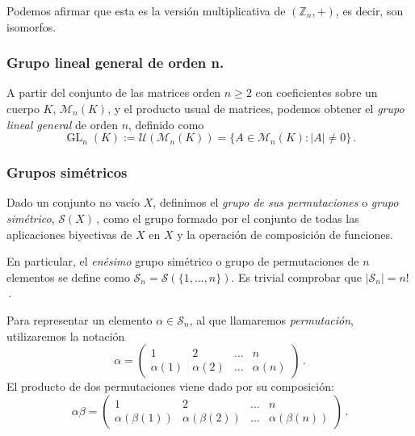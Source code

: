 Podemos afirmar que esta es la versión multiplicativa de $(\mathbb{Z}_n,+)$, es decir, son isomorfos.

\subsubsection{Grupo lineal general de orden n.}

A partir del conjunto de las matrices orden $n \geq 2$ con coeficientes sobre un cuerpo $K$, $\mathcal M_n(K)$, y el producto usual de matrices, podemos obtener el \textit{grupo lineal general} de orden $n$, definido como \begin{equation*}
  \operatorname{GL}_n(K) := \mathcal U(\mathcal M_n(K)) = \{A \in \mathcal M_n(K) : |A| \neq 0\}\,.
\end{equation*}

\subsubsection{Grupos simétricos}

Dado un conjunto no vacío $X$, definimos el \textit{grupo de sus permutaciones} o \textit{grupo simétrico}, $\mathcal S(X)$\,, como el grupo formado por el conjunto de todas las aplicaciones biyectivas de $X$ en $X$ y la operación de composición de funciones.

En particular, el \textit{enésimo} grupo simétrico o grupo de permutaciones de $n$ elementos se define como $\mathcal S_n = \mathcal S\left(\{1,\dots,n\}\right)$. Es trivial comprobar que $|\mathcal S_n| = n!$\,.

Para representar un elemento $\alpha \in \mathcal S_n$, al que llamaremos \textit{permutación}, utilizaremos la notación \begin{equation*}
  \alpha = \begin{pmatrix}
    1 & 2 & \hdots & n \\
    \alpha(1) & \alpha(2) & \hdots & \alpha(n) 
  \end{pmatrix}\,.
\end{equation*}
El producto de dos permutaciones viene dado por su composición: \begin{equation*}
  \alpha \beta = \begin{pmatrix}
    1 & 2 & \hdots & n \\
    \alpha(\beta(1)) & \alpha(\beta(2)) & \hdots & \alpha(\beta(n))
  \end{pmatrix}\,.
\end{equation*}

